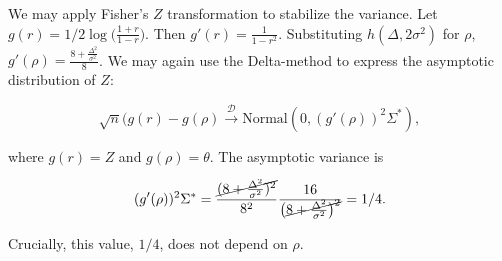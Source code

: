 \documentclass[english,,man]{apa6}
\begin{document}
We may apply Fisher's \(Z\) transformation to stabilize the variance. Let \(g(r) = 1/2 \log \big(\frac{1 + r}{1 - r}\big)\). Then \(g'(r) = \frac{1}{1 - r^2}\). Substituting \(h(\Delta, 2\sigma^2)\) for \(\rho\), \(g'(\rho) = \frac{8 + \frac{\Delta^2}{\sigma^2}}{8}\). We may again use the Delta-method to express the asymptotic distribution of \(Z\):

\[\sqrt{n}(g(r) - g(\rho) \stackrel{\mathscr{D}}{\rightarrow} \mbox{Normal}(0, (g'(\rho))^2 \Sigma^*),\]

where \(g(r) = Z\) and \(g(\rho) = \theta\). The asymptotic variance is

\[
(g'(\rho))^2 \Sigma^* = \frac{\cancel{(8 + \frac{\Delta^2}{\sigma^2})^2}}{8^2} \frac{16}{\big(\cancel{8 + \frac{\Delta^2}{\sigma^2}\big)^2}} = 1/4.
\]

Crucially, this value, \(1/4\), does not depend on \(\rho\).
\end{document}
